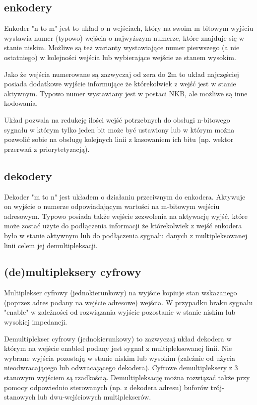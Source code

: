 \documentclass{pdfBooklets}
\begin{document}
\subsection{enkodery}

Enkoder "n to m" jest to układ o n wejściach, który na swoim m bitowym wyjściu wystawia numer (typowo) wejścia o najwyższym numerze, które znajduje się w stanie niskim. Możliwe są też warianty wystawiające numer pierwszego (a nie ostatniego) w kolejności wejścia lub wybierające wejście ze stanem wysokim.

Jako że wejścia numerowane są zazwyczaj od zera do 2m to układ najczęściej posiada dodatkowe wyjście informujące że którekolwiek z wejść jest w stanie aktywnym. Typowo numer wystawiany jest w postaci NKB, ale możliwe są inne kodowania.

Układ pozwala na redukcję ilości wejść potrzebnych do obsługi n-bitowego sygnału w którym tylko jeden bit może być ustawiony lub w którym można pozwolić sobie na obsługę kolejnych linii z kasowaniem ich bitu (np. wektor przerwań z priorytetyzacją).

\subsection{dekodery}

Dekoder "m to n" jest układem o działaniu przeciwnym do enkodera. Aktywuje on wyjście o numerze odpowiadającym wartości na m-bitowym wejściu adresowym. Typowo posiada także wejście zezwolenia na aktywację wyjść, które może zostać użyte do podłączenia informacji że którekolwiek z wejść enkodera było w stanie aktywnym lub do podłączenia sygnału danych z multipleksowanej linii celem jej demultipleksacji.

\subsection{(de)multipleksery cyfrowy}

Multiplekser cyfrowy (jednokierunkowy) na wyjście kopiuje stan wskazanego (poprzez adres podany na wejście adresowe) wejścia. W przypadku braku sygnału "enable" w zależności od rozwiązania wyjście pozostanie w stanie niskim lub wysokiej impedancji.

Demultiplekser cyfrowy (jednokierunkowy) to zazwyczaj układ dekodera w którym na wejście enabled podany jest sygnał z multipleksowanej linii. Nie wybrane wyjścia pozostają w stanie niskim lub wysokim (zależnie od użycia nieodwracającego lub odwracającego dekodera). Cyfrowe demultipleksery z 3 stanowym wyjściem są rzadkością. Demultipleksację można rozwiązać także przy pomocy odpowiednio sterowanych (np. z dekodera adresu) buforów trój-stanowych lub dwu-wejściowych multiplekserów.
\end{document}

